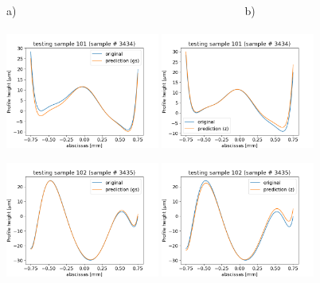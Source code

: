 \documentclass[]{article}
\begin{document}
  

\thispagestyle{empty}


\begin{figure}
    a)~~~~~~~~~~~~~~~~~~~~~~~~~~~~~~~~~~~~~~~~~b)~~~~~~~~~~~~~~~~~~\\
    \includegraphics[width=0.45\textwidth]{figures/v13p101.png}
    \includegraphics[width=0.45\textwidth]{figures/v14p101.png}

    \includegraphics[width=0.45\textwidth]{figures/v13p102.png}
    \includegraphics[width=0.45\textwidth]{figures/v14p102.png}


\end{figure}
\end{document}
